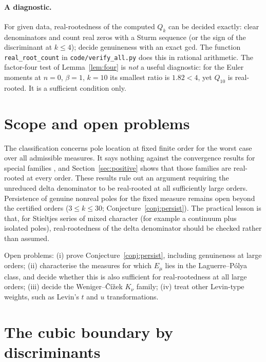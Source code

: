 \documentclass[11pt,a4paper]{article}
\theoremstyle{definition}
\theoremstyle{remark}
\begin{document}
\paragraph{A diagnostic.}
For given data, real-rootedness of the computed $Q_k$ can be decided exactly:
clear denominators and count real zeros with a Sturm sequence (or the sign
of the discriminant at $k\le4$); decide genuineness with an exact gcd. The
function \texttt{real\_root\_count} in \texttt{code/verify\_all.py} does
this in rational arithmetic. The factor-four test of
Lemma~\ref{lem:four} is \emph{not} a useful diagnostic: for the Euler
moments at $n=0$, $\beta=1$, $k=10$ its smallest ratio is $1.82<4$, yet
$Q_{10}$ is real-rooted. It is a sufficient condition only.

\section{Scope and open problems}\label{sec:scope}

The classification concerns pole location at fixed finite order for the
worst case over all admissible measures. It says nothing against the
convergence results for special families \cite{BorghiWeniger2015,
Borghi2026asymptotic}, and Section~\ref{sec:positive} shows
that those families are real-rooted at every order. These results rule
out an argument requiring the unreduced delta denominator to be
real-rooted at all sufficiently large orders. Persistence of genuine
nonreal poles for the fixed measure remains open beyond the certified
orders ($3\le k\le30$; Conjecture~\ref{conj:persist}). The practical lesson is that, for Stieltjes series of mixed
character (for example a continuum plus isolated poles), real-rootedness of
the delta denominator should be checked rather than assumed.

Open problems: (i) prove Conjecture~\ref{conj:persist}, including
genuineness at large orders; (ii) characterise the measures for which
$E_\mu$ lies in the Laguerre--Pólya class, and decide whether this is also
sufficient for real-rootedness at all large orders; (iii) decide the
Weniger--Čížek $K_\nu$ family; (iv) treat other Levin-type weights, such
as Levin's $t$ and $u$ transformations.

\appendix
\section{The cubic boundary by discriminants}\label{app:cubic}
\end{document}
